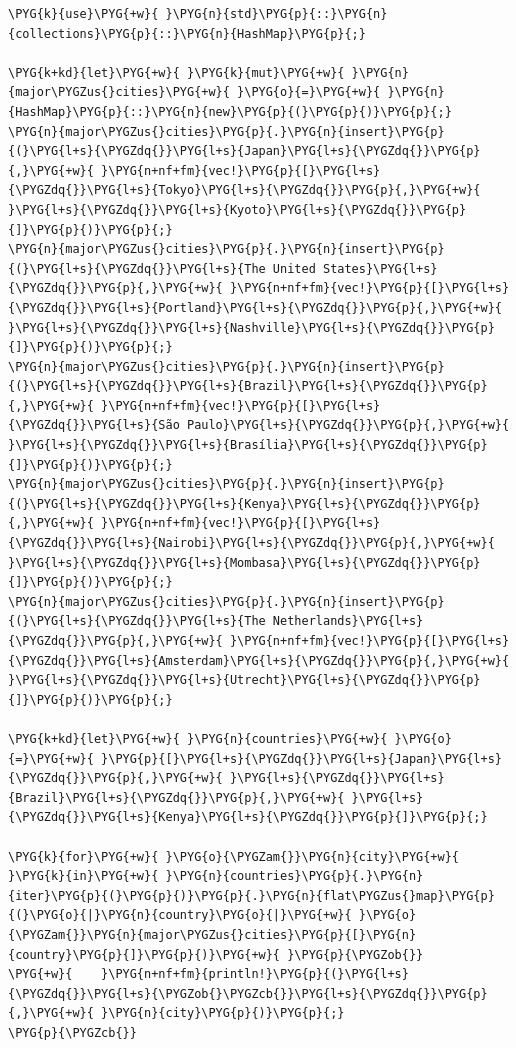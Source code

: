 \begin{Verbatim}[commandchars=\\\{\},breaklines=true,breakanywhere=true,fontsize=\codefont,xleftmargin=17bp]
\PYG{k}{use}\PYG{+w}{ }\PYG{n}{std}\PYG{p}{::}\PYG{n}{collections}\PYG{p}{::}\PYG{n}{HashMap}\PYG{p}{;}

\PYG{k+kd}{let}\PYG{+w}{ }\PYG{k}{mut}\PYG{+w}{ }\PYG{n}{major\PYGZus{}cities}\PYG{+w}{ }\PYG{o}{=}\PYG{+w}{ }\PYG{n}{HashMap}\PYG{p}{::}\PYG{n}{new}\PYG{p}{(}\PYG{p}{)}\PYG{p}{;}
\PYG{n}{major\PYGZus{}cities}\PYG{p}{.}\PYG{n}{insert}\PYG{p}{(}\PYG{l+s}{\PYGZdq{}}\PYG{l+s}{Japan}\PYG{l+s}{\PYGZdq{}}\PYG{p}{,}\PYG{+w}{ }\PYG{n+nf+fm}{vec!}\PYG{p}{[}\PYG{l+s}{\PYGZdq{}}\PYG{l+s}{Tokyo}\PYG{l+s}{\PYGZdq{}}\PYG{p}{,}\PYG{+w}{ }\PYG{l+s}{\PYGZdq{}}\PYG{l+s}{Kyoto}\PYG{l+s}{\PYGZdq{}}\PYG{p}{]}\PYG{p}{)}\PYG{p}{;}
\PYG{n}{major\PYGZus{}cities}\PYG{p}{.}\PYG{n}{insert}\PYG{p}{(}\PYG{l+s}{\PYGZdq{}}\PYG{l+s}{The United States}\PYG{l+s}{\PYGZdq{}}\PYG{p}{,}\PYG{+w}{ }\PYG{n+nf+fm}{vec!}\PYG{p}{[}\PYG{l+s}{\PYGZdq{}}\PYG{l+s}{Portland}\PYG{l+s}{\PYGZdq{}}\PYG{p}{,}\PYG{+w}{ }\PYG{l+s}{\PYGZdq{}}\PYG{l+s}{Nashville}\PYG{l+s}{\PYGZdq{}}\PYG{p}{]}\PYG{p}{)}\PYG{p}{;}
\PYG{n}{major\PYGZus{}cities}\PYG{p}{.}\PYG{n}{insert}\PYG{p}{(}\PYG{l+s}{\PYGZdq{}}\PYG{l+s}{Brazil}\PYG{l+s}{\PYGZdq{}}\PYG{p}{,}\PYG{+w}{ }\PYG{n+nf+fm}{vec!}\PYG{p}{[}\PYG{l+s}{\PYGZdq{}}\PYG{l+s}{São Paulo}\PYG{l+s}{\PYGZdq{}}\PYG{p}{,}\PYG{+w}{ }\PYG{l+s}{\PYGZdq{}}\PYG{l+s}{Brasília}\PYG{l+s}{\PYGZdq{}}\PYG{p}{]}\PYG{p}{)}\PYG{p}{;}
\PYG{n}{major\PYGZus{}cities}\PYG{p}{.}\PYG{n}{insert}\PYG{p}{(}\PYG{l+s}{\PYGZdq{}}\PYG{l+s}{Kenya}\PYG{l+s}{\PYGZdq{}}\PYG{p}{,}\PYG{+w}{ }\PYG{n+nf+fm}{vec!}\PYG{p}{[}\PYG{l+s}{\PYGZdq{}}\PYG{l+s}{Nairobi}\PYG{l+s}{\PYGZdq{}}\PYG{p}{,}\PYG{+w}{ }\PYG{l+s}{\PYGZdq{}}\PYG{l+s}{Mombasa}\PYG{l+s}{\PYGZdq{}}\PYG{p}{]}\PYG{p}{)}\PYG{p}{;}
\PYG{n}{major\PYGZus{}cities}\PYG{p}{.}\PYG{n}{insert}\PYG{p}{(}\PYG{l+s}{\PYGZdq{}}\PYG{l+s}{The Netherlands}\PYG{l+s}{\PYGZdq{}}\PYG{p}{,}\PYG{+w}{ }\PYG{n+nf+fm}{vec!}\PYG{p}{[}\PYG{l+s}{\PYGZdq{}}\PYG{l+s}{Amsterdam}\PYG{l+s}{\PYGZdq{}}\PYG{p}{,}\PYG{+w}{ }\PYG{l+s}{\PYGZdq{}}\PYG{l+s}{Utrecht}\PYG{l+s}{\PYGZdq{}}\PYG{p}{]}\PYG{p}{)}\PYG{p}{;}

\PYG{k+kd}{let}\PYG{+w}{ }\PYG{n}{countries}\PYG{+w}{ }\PYG{o}{=}\PYG{+w}{ }\PYG{p}{[}\PYG{l+s}{\PYGZdq{}}\PYG{l+s}{Japan}\PYG{l+s}{\PYGZdq{}}\PYG{p}{,}\PYG{+w}{ }\PYG{l+s}{\PYGZdq{}}\PYG{l+s}{Brazil}\PYG{l+s}{\PYGZdq{}}\PYG{p}{,}\PYG{+w}{ }\PYG{l+s}{\PYGZdq{}}\PYG{l+s}{Kenya}\PYG{l+s}{\PYGZdq{}}\PYG{p}{]}\PYG{p}{;}

\PYG{k}{for}\PYG{+w}{ }\PYG{o}{\PYGZam{}}\PYG{n}{city}\PYG{+w}{ }\PYG{k}{in}\PYG{+w}{ }\PYG{n}{countries}\PYG{p}{.}\PYG{n}{iter}\PYG{p}{(}\PYG{p}{)}\PYG{p}{.}\PYG{n}{flat\PYGZus{}map}\PYG{p}{(}\PYG{o}{|}\PYG{n}{country}\PYG{o}{|}\PYG{+w}{ }\PYG{o}{\PYGZam{}}\PYG{n}{major\PYGZus{}cities}\PYG{p}{[}\PYG{n}{country}\PYG{p}{]}\PYG{p}{)}\PYG{+w}{ }\PYG{p}{\PYGZob{}}
\PYG{+w}{    }\PYG{n+nf+fm}{println!}\PYG{p}{(}\PYG{l+s}{\PYGZdq{}}\PYG{l+s}{\PYGZob{}\PYGZcb{}}\PYG{l+s}{\PYGZdq{}}\PYG{p}{,}\PYG{+w}{ }\PYG{n}{city}\PYG{p}{)}\PYG{p}{;}
\PYG{p}{\PYGZcb{}}
\end{Verbatim}

